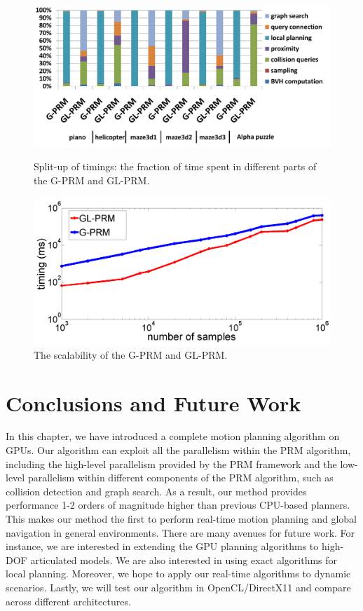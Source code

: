 \begin{figure}[!htb]
  \centering
  \includegraphics[width=0.9\linewidth]{figs/4/breakdown.pdf}
  \caption[Split-up of timings for the GPU-based planner]{Split-up of timings: the fraction of time spent in different parts of the G-PRM and GL-PRM.}
  \label{fig:4:breakdown}

  \centering
  \includegraphics[width=0.9\linewidth]{figs/4/scalability.png}
  \caption[The scalability of G-PRM and GL-PRM algorithms]{The scalability of the G-PRM and GL-PRM.}
  \label{fig:4:scalability}
\end{figure}

\section{Conclusions and Future Work}
In this chapter, we have introduced a complete motion planning algorithm on GPUs. Our algorithm can exploit all the parallelism within the PRM algorithm, including the high-level parallelism provided by the PRM framework and the low-level parallelism within different components of the PRM algorithm, such as collision detection and graph search. As a result, our method provides performance 1-2 orders of magnitude higher than previous CPU-based planners. This makes our method the first to perform real-time motion planning and global navigation in general environments.
There are many avenues for future work. For instance, we are interested in extending the GPU planning algorithms to high-DOF articulated models. We are also interested in using exact algorithms for local planning. Moreover, we hope to apply our real-time algorithms to dynamic scenarios. Lastly, we will test our algorithm in OpenCL/DirectX11 and compare across different architectures.
